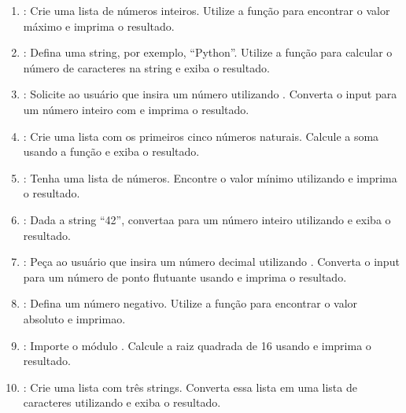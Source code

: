 \documentclass[letterpaper,10pt,english]{jupyterBook}
\begin{document}
\label{\detokenize{chapters/ch5/ch5:exercicios}}\begin{enumerate}
%
\item {} 
\sphinxAtStartPar
{}:
Crie uma lista de números inteiros. Utilize a função  para encontrar o valor máximo e imprima o resultado.

\item {} 
\sphinxAtStartPar
{}:
Defina uma string, por exemplo, “Python”. Utilize a função  para calcular o número de caracteres na string e exiba o resultado.

\item {} 
\sphinxAtStartPar
{}:
Solicite ao usuário que insira um número utilizando . Converta o input para um número inteiro com  e imprima o resultado.

\item {} 
\sphinxAtStartPar
{}:
Crie uma lista com os primeiros cinco números naturais. Calcule a soma usando a função  e exiba o resultado.

\item {} 
\sphinxAtStartPar
{}:
Tenha uma lista de números. Encontre o valor mínimo utilizando  e imprima o resultado.

\item {} 
\sphinxAtStartPar
{}:
Dada a string “42”, converta\sphinxhyphen{}a para um número inteiro utilizando  e exiba o resultado.

\item {} 
\sphinxAtStartPar
{}:
Peça ao usuário que insira um número decimal utilizando . Converta o input para um número de ponto flutuante usando  e imprima o resultado.

\item {} 
\sphinxAtStartPar
{}:
Defina um número negativo. Utilize a função  para encontrar o valor absoluto e imprima\sphinxhyphen{}o.

\item {} 
\sphinxAtStartPar
{}:
Importe o módulo . Calcule a raiz quadrada de 16 usando  e imprima o resultado.

\item {} 
\sphinxAtStartPar
{}:
Crie uma lista com três strings. Converta essa lista em uma lista de caracteres utilizando  e exiba o resultado.

\end{enumerate}
\end{document}
